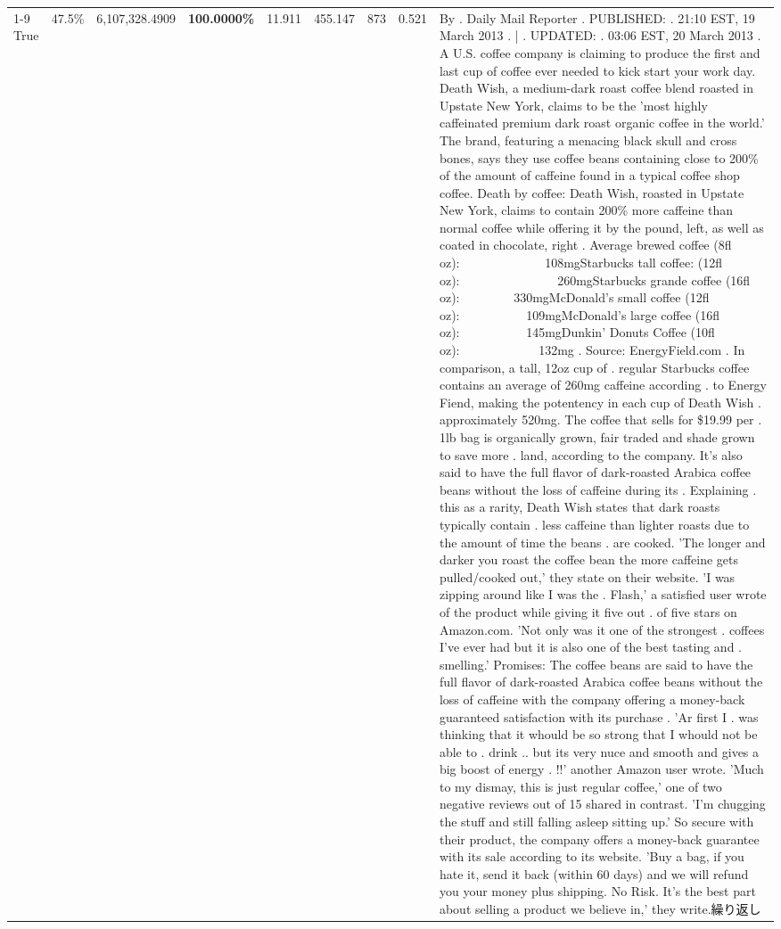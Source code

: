 \begin{table}[H]
{\begin{tabular}{lllrlllll}
\cline{1-9}
True & 47.5\% & 6,107,328.4909 & \bfseries \color{red} 100.0000\% & 11.911 & 455.147 & 873 & 0.521 & By . Daily Mail Reporter . PUBLISHED: . 21:10 EST, 19 March 2013 . | . UPDATED: . 03:06 EST, 20 March 2013 . A U.S. coffee company is claiming to produce the first and last cup of coffee ever needed to kick start your work day. Death Wish, a medium-dark roast coffee blend roasted in Upstate New York, claims to be the 'most highly caffeinated premium dark roast organic coffee in the world.' The brand, featuring a menacing black skull and cross bones, says they use coffee beans containing close to 200\% of the amount of caffeine found in a typical coffee shop coffee. Death by coffee: Death Wish, roasted in Upstate New York, claims to contain 200\% more caffeine than normal coffee while offering it by the pound, left, as well as coated in chocolate, right . Average brewed coffee (8fl oz):              108mgStarbucks tall coffee: (12fl oz):                260mgStarbucks grande coffee (16fl oz):         330mgMcDonald's small coffee (12fl oz):           109mgMcDonald's large coffee (16fl oz):           145mgDunkin' Donuts Coffee (10fl oz):             132mg . Source: EnergyField.com . In comparison, a tall, 12oz cup of . regular Starbucks coffee contains an average of 260mg caffeine according . to Energy Fiend, making the potentency in each cup of Death Wish . approximately 520mg. The coffee that sells for \$19.99 per . 1lb bag is organically grown, fair traded and shade grown to save more . land, according to the company. It's also said to have the full flavor of dark-roasted Arabica coffee beans without the loss of caffeine during its . Explaining . this as a rarity, Death Wish states that dark roasts typically contain . less caffeine than lighter roasts due to the amount of time the beans . are cooked. 'The longer and darker you roast the coffee bean the more caffeine gets pulled/cooked out,' they state on their website. 'I was zipping around like I was the . Flash,' a satisfied user wrote of the product while giving it five out . of five stars on Amazon.com. 'Not only was it one of the strongest . coffees I've ever had but it is also one of the best tasting and . smelling.’ Promises: The coffee beans are said to have the full flavor of dark-roasted Arabica coffee beans without the loss of caffeine with the company offering a money-back guaranteed satisfaction with its purchase . 'Ar first I . was thinking that it whould be so strong that I whould not be able to . drink .. but its very nuce and smooth and gives a big boost of energy . !!' another Amazon user wrote. 'Much to my dismay, this is just regular coffee,' one of two negative reviews out of 15 shared in contrast. 'I'm chugging the stuff and still falling asleep sitting up.' So secure with their product, the company offers a money-back guarantee with its sale according to its website. 'Buy a bag, if you hate it, send it back (within 60 days) and we will refund you your money plus shipping. No Risk. It’s the best part about selling a product we believe in,' they write.繰り返し \\

\end{tabular}}
\end{table}
